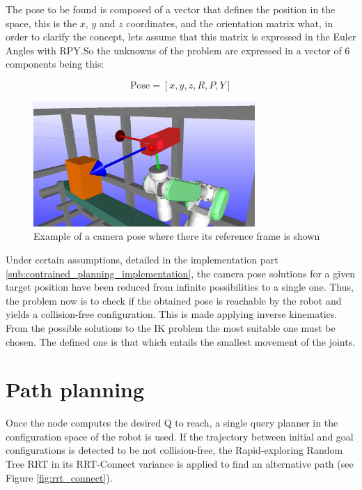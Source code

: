 The pose to be found is composed of a vector that defines the position in the space, this is the $x$, $y$ and $z$ coordinates, and the orientation matrix what, in order to clarify the concept, lets assume that this matrix is expressed in the Euler Angles with RPY.So the unknowns of the problem are expressed in a vector of 6 components being this:

\begin{equation}
\label{eq:pose_cartesian_coordinates}
	\mathrm{Pose} = [x,y,z,R,P,Y]
\end{equation}

\begin{figure}[htb]
	\centering
	\includegraphics[width=0.75\textwidth]{figures/camera_pose_example}
	\caption{Example of a camera pose where there its reference frame is shown}
	\label{fig:camera_pose_example}
\end{figure}

Under certain assumptions, detailed in the implementation part \ref{sub:contrained_planning_implementation}, the camera pose solutions for a given target position have been reduced from infinite possibilities to a single one.
Thus, the problem now is to check if the obtained pose is reachable by the robot and yields a collision-free configuration.
This is made applying inverse kinematics.
From the possible solutions to the IK problem the most suitable one must be chosen.
The defined one is that which entails the smallest movement of the joints.

\section{Path planning} %
\label{sec:path_planning}
Once the node computes the desired Q to reach, a single query planner in the configuration space of the robot is used. If the trajectory between initial and goal configurations is detected to be not collision-free, the Rapid-exploring Random Tree RRT in its RRT-Connect variance \cite{RRTConnect} is applied to find an alternative path (see Figure \ref{fig:rrt_connect}).

